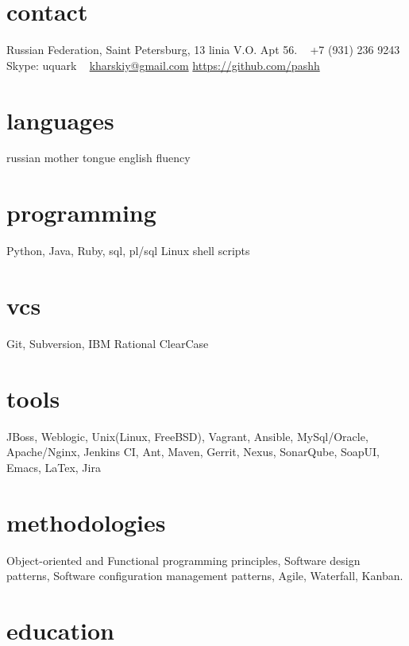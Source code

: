 \documentclass[nocolors]{friggeri-cv-a4}
\begin{document}


\begin{aside} %
\section{contact}
Russian Federation,
Saint Petersburg,
13 linia V.O. Apt 56.
~
+7 (931) 236 9243
Skype: uquark
~
\href{mailto:kharskiy@gmail.com}{kharskiy@gmail.com}
\href{https://github.com/pashh}{https://github.com/pashh}
\section{languages}
russian mother tongue
english fluency
\section{programming}
Python, Java, Ruby, sql, pl/sql
Linux shell scripts
\section{vcs}
Git, Subversion, IBM Rational ClearCase
\section{tools}
JBoss, Weblogic, Unix(Linux, FreeBSD), Vagrant, Ansible, MySql/Oracle, Apache/Nginx, Jenkins CI, Ant, Maven, Gerrit, Nexus, SonarQube, SoapUI, Emacs, LaTex, Jira
\section{methodologies}
Object-oriented and
Functional programming principles,
Software design patterns,
Software configuration management patterns,
Agile, Waterfall, Kanban.
\end{aside}


\section{education}
\end{document}

